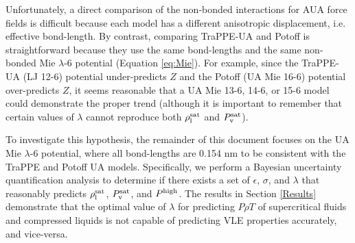\documentclass[preprint,letterpaper,floatfix,citeautoscript,aip,jcp]{revtex4-1}
\begin{document}
Unfortunately, a direct comparison of the non-bonded interactions for AUA force fields is difficult because each model has a different anisotropic displacement, i.e. effective bond-length. 
By contrast, 
comparing TraPPE-UA and Potoff is straightforward because they use the same bond-lengths and the same non-bonded Mie $\lambda$-6 potential (Equation \ref{eq:Mie}). For example, since the TraPPE-UA (LJ 12-6) potential under-predicts $Z$ and the Potoff (UA Mie 16-6) potential over-predicts $Z$, it seems reasonable that a UA Mie 13-6, 14-6, or 15-6 model 
could
demonstrate the proper trend (although it is important to remember that certain values of $\lambda$ cannot reproduce both $\rho_{\rm l}^{\rm sat}$ and $P_{\rm v}^{\rm sat}$).

To investigate this hypothesis, the remainder of this document focuses on the UA Mie $\lambda$-6 potential, where all bond-lengths are 0.154 nm to be consistent with the TraPPE and Potoff UA models.
Specifically, we perform a Bayesian uncertainty quantification analysis to determine if there exists a set of $\epsilon$, $\sigma$, and $\lambda$ that reasonably predicts $\rho_{\rm l}^{\rm sat}$, $P_{\rm v}^{\rm sat}$, and $P^{\rm high}$. The results in Section \ref{Results} demonstrate that the optimal value of $\lambda$ for predicting $P \rho T$ of supercritical fluids and compressed liquids is not capable of predicting VLE properties accurately, and vice-versa. 


\end{document}
